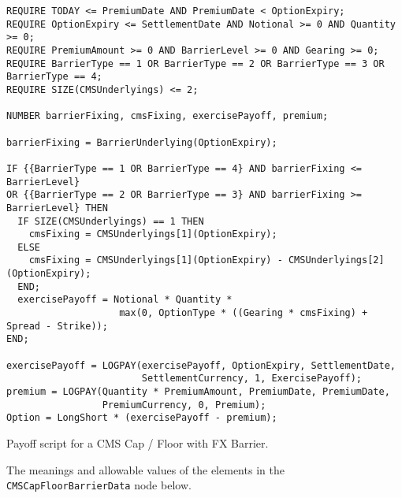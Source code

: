 \begin{listing}[hbt] 
\begin{verbatim} 
REQUIRE TODAY <= PremiumDate AND PremiumDate < OptionExpiry;
REQUIRE OptionExpiry <= SettlementDate AND Notional >= 0 AND Quantity >= 0;
REQUIRE PremiumAmount >= 0 AND BarrierLevel >= 0 AND Gearing >= 0;
REQUIRE BarrierType == 1 OR BarrierType == 2 OR BarrierType == 3 OR BarrierType == 4;
REQUIRE SIZE(CMSUnderlyings) <= 2;

NUMBER barrierFixing, cmsFixing, exercisePayoff, premium;

barrierFixing = BarrierUnderlying(OptionExpiry);

IF {{BarrierType == 1 OR BarrierType == 4} AND barrierFixing <= BarrierLevel}
OR {{BarrierType == 2 OR BarrierType == 3} AND barrierFixing >= BarrierLevel} THEN
  IF SIZE(CMSUnderlyings) == 1 THEN
    cmsFixing = CMSUnderlyings[1](OptionExpiry);
  ELSE
    cmsFixing = CMSUnderlyings[1](OptionExpiry) - CMSUnderlyings[2](OptionExpiry);
  END;
  exercisePayoff = Notional * Quantity *
                    max(0, OptionType * ((Gearing * cmsFixing) + Spread - Strike));
END;

exercisePayoff = LOGPAY(exercisePayoff, OptionExpiry, SettlementDate,
                        SettlementCurrency, 1, ExercisePayoff);
premium = LOGPAY(Quantity * PremiumAmount, PremiumDate, PremiumDate,
                 PremiumCurrency, 0, Premium);
Option = LongShort * (exercisePayoff - premium);
\end{verbatim} 
\caption{Payoff script for a CMS Cap / Floor with FX Barrier.} 
\label{lst:cms_capfloor_barrier} 
\end{listing} 
 
The meanings and allowable values of the elements in the \lstinline!CMSCapFloorBarrierData! node below.
 
